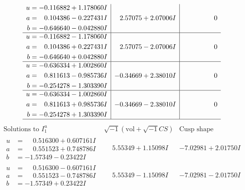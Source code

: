 \documentclass[1p]{elsarticle_modified}
\theoremstyle{definition}
\newcommand{\I}{\sqrt{-1}}
\begin{document}
$$\begin{array}{c|c|c}
\begin{aligned}
u &= -0.116882 + 1.178060 I \\
a &= \phantom{-}0.104386 - 0.227431 I \\
b &= -0.646640 - 0.042880 I\end{aligned}
 & \phantom{-}2.57075 + 2.07006 I & \phantom{-0.000000 } 0 \\ \hline\begin{aligned}
u &= -0.116882 - 1.178060 I \\
a &= \phantom{-}0.104386 + 0.227431 I \\
b &= -0.646640 + 0.042880 I\end{aligned}
 & \phantom{-}2.57075 - 2.07006 I & \phantom{-0.000000 } 0 \\ \hline\begin{aligned}
u &= -0.636334 + 1.002860 I \\
a &= \phantom{-}0.811613 - 0.985736 I \\
b &= -0.254278 - 1.303390 I\end{aligned}
 & -0.34669 + 2.38010 I & \phantom{-0.000000 } 0 \\ \hline\begin{aligned}
u &= -0.636334 - 1.002860 I \\
a &= \phantom{-}0.811613 + 0.985736 I \\
b &= -0.254278 + 1.303390 I\end{aligned}
 & -0.34669 - 2.38010 I & \phantom{-0.000000 } 0\\
 \hline 
 \end{array}$$\newpage$$\begin{array}{c|c|c}  
\text{Solutions to }I^u_{1}& \I (\text{vol} + \sqrt{-1}CS) & \text{Cusp shape}\\
 \hline 
\begin{aligned}
u &= \phantom{-}0.516300 + 0.607161 I \\
a &= \phantom{-}0.551523 + 0.748786 I \\
b &= -1.57349 - 0.23422 I\end{aligned}
 & \phantom{-}5.55349 + 1.15098 I & -7.02981 + 2.01750 I \\ \hline\begin{aligned}
u &= \phantom{-}0.516300 - 0.607161 I \\
a &= \phantom{-}0.551523 - 0.748786 I \\
b &= -1.57349 + 0.23422 I\end{aligned}
 & \phantom{-}5.55349 - 1.15098 I & -7.02981 - 2.01750 I \\ \hline\begin{aligned}

\end{aligned}
\end{array}$$
\end{document}
